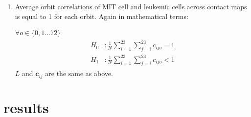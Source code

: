\documentclass[a4,center,fleqn]{NAR}
\begin{document}
\begin{enumerate}
\begin{enumerate}
                \item Average orbit correlations  of MIT cell
                    and leukemic cells across contact maps is equal to 1
                    for each orbit.
                Again in mathematical terms:

                        \smallskip

                    $\forall o \in \{0, 1 ... 72\}$
                \begin{align}
                    \begin{split}
                        H_0&: \frac{1}{N}\sum_{i=1}^{23}{\sum_{j=i}^{23}{c_{ijo}}} = 1 \\
                        H_1&: \frac{1}{N}\sum_{i=1}^{23}{\sum_{j=i}^{23}{c_{ijo}}} < 1
                    \end{split}
                    \label{eq:h2a}
                \end{align}
                        $L$ and $\mathbf{c}_{ij}$ are the same as above.

            \end{enumerate}
\end{enumerate}
\section{results}
\end{document}
